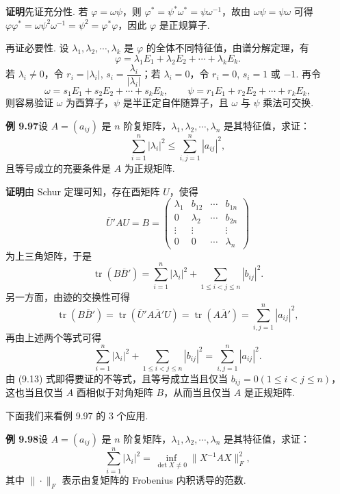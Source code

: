 \documentclass[UTF8, 12pt, fontset=fandol, oneside]{ctexart}
\begin{document}
\noindent\textbf{证明}\quad 先证充分性. 若 $\varphi=\omega\psi$，则 $\varphi^*=\psi^*\omega^*=\psi\omega^{-1}$，故由 $\omega\psi=\psi\omega$ 可得 $\varphi\varphi^*=\omega\psi^2\omega^{-1}=\psi^2=\varphi^*\varphi$，因此 $\varphi$ 是正规算子.

再证必要性. 设 $\lambda_1,\lambda_2,\cdots,\lambda_k$ 是 $\varphi$ 的全体不同特征值，由谱分解定理，有
\[
\varphi=\lambda_1E_1+\lambda_2E_2+\cdots+\lambda_kE_k.
\]
若 $\lambda_i\ne0$，令 $r_i=|\lambda_i|$, $s_i=\dfrac{\lambda_i}{|\lambda_i|}$；若 $\lambda_i=0$，令 $r_i=0$, $s_i=1$ 或 $-1$. 再令
\[
\omega=s_1E_1+s_2E_2+\cdots+s_kE_k,\qquad
\psi=r_1E_1+r_2E_2+\cdots+r_kE_k,
\]
则容易验证 $\omega$ 为酉算子，$\psi$ 是半正定自伴随算子，且 $\omega$ 与 $\psi$ 乘法可交换.

\noindent\textbf{例 9.97}\quad 设 $A=(a_{ij})$ 是 $n$ 阶复矩阵，$\lambda_1,\lambda_2,\cdots,\lambda_n$ 是其特征值，求证：
\[
\sum_{i=1}^n|\lambda_i|^2\le\sum_{i,j=1}^n|a_{ij}|^2,
\]
且等号成立的充要条件是 $A$ 为正规矩阵.

\noindent\textbf{证明}\quad 由 Schur 定理可知，存在酉矩阵 $U$，使得
\[
\overline{U}'AU=B=
\begin{pmatrix}
\lambda_1&b_{12}&\cdots&b_{1n}\\
0&\lambda_2&\cdots&b_{2n}\\
\vdots&\vdots&&\vdots\\
0&0&\cdots&\lambda_n
\end{pmatrix}
\]
为上三角矩阵，于是
\[
\operatorname{tr}(B\overline{B}')=\sum_{i=1}^n|\lambda_i|^2+\sum_{1\le i<j\le n}|b_{ij}|^2.
\]
另一方面，由迹的交换性可得
\[
\operatorname{tr}(B\overline{B}')=\operatorname{tr}(\overline{U}'A\overline{A}'U)=\operatorname{tr}(A\overline{A}')=\sum_{i,j=1}^n|a_{ij}|^2,
\]
再由上述两个等式可得
\begin{equation}
\sum_{i=1}^n|\lambda_i|^2+\sum_{1\le i<j\le n}|b_{ij}|^2=\sum_{i,j=1}^n|a_{ij}|^2.
\tag{9.13}
\end{equation}
由 (9.13) 式即得要证的不等式，且等号成立当且仅当 $b_{ij}=0(1\le i<j\le n)$，这也当且仅当 $A$ 酉相似于对角矩阵 $B$，从而当且仅当 $A$ 是正规矩阵.

下面我们来看例 9.97 的 3 个应用.

\noindent\textbf{例 9.98}\quad 设 $A=(a_{ij})$ 是 $n$ 阶复矩阵，$\lambda_1,\lambda_2,\cdots,\lambda_n$ 是其特征值，求证：
\[
\sum_{i=1}^n|\lambda_i|^2=\inf_{\det X\ne0}\|X^{-1}AX\|_F^2,
\]
其中 $\|\cdot\|_F$ 表示由复矩阵的 Frobenius 内积诱导的范数.
\end{document}
